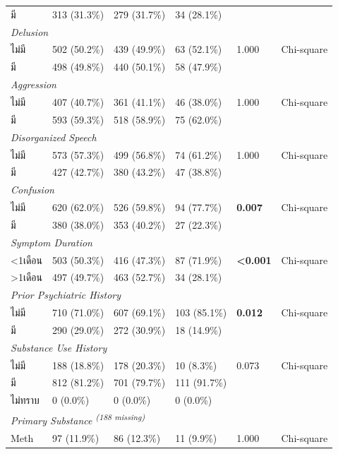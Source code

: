 \begin{table}[htbp]
\begin{tabular}{llllll}
\quad มี & 313 (31.3\%) & 279 (31.7\%) & 34 (28.1\%) &  &  \\
\multicolumn{6}{l}{\textit{Delusion}} \\
\quad ไม่มี & 502 (50.2\%) & 439 (49.9\%) & 63 (52.1\%) & 1.000 & Chi-square \\
\quad มี & 498 (49.8\%) & 440 (50.1\%) & 58 (47.9\%) &  &  \\
\multicolumn{6}{l}{\textit{Aggression}} \\
\quad ไม่มี & 407 (40.7\%) & 361 (41.1\%) & 46 (38.0\%) & 1.000 & Chi-square \\
\quad มี & 593 (59.3\%) & 518 (58.9\%) & 75 (62.0\%) &  &  \\
\multicolumn{6}{l}{\textit{Disorganized Speech}} \\
\quad ไม่มี & 573 (57.3\%) & 499 (56.8\%) & 74 (61.2\%) & 1.000 & Chi-square \\
\quad มี & 427 (42.7\%) & 380 (43.2\%) & 47 (38.8\%) &  &  \\
\multicolumn{6}{l}{\textit{Confusion}} \\
\quad ไม่มี & 620 (62.0\%) & 526 (59.8\%) & 94 (77.7\%) & \textbf{0.007} & Chi-square \\
\quad มี & 380 (38.0\%) & 353 (40.2\%) & 27 (22.3\%) &  &  \\
\multicolumn{6}{l}{\textit{Symptom Duration}} \\
\quad \textless{}1เดือน & 503 (50.3\%) & 416 (47.3\%) & 87 (71.9\%) & \textbf{<0.001} & Chi-square \\
\quad \textgreater{}1เดือน & 497 (49.7\%) & 463 (52.7\%) & 34 (28.1\%) &  &  \\
\multicolumn{6}{l}{\textit{Prior Psychiatric History}} \\
\quad ไม่มี & 710 (71.0\%) & 607 (69.1\%) & 103 (85.1\%) & \textbf{0.012} & Chi-square \\
\quad มี & 290 (29.0\%) & 272 (30.9\%) & 18 (14.9\%) &  &  \\
\multicolumn{6}{l}{\textit{Substance Use History}} \\
\quad ไม่มี & 188 (18.8\%) & 178 (20.3\%) & 10 (8.3\%) & 0.073 & Chi-square \\
\quad มี & 812 (81.2\%) & 701 (79.7\%) & 111 (91.7\%) &  &  \\
\quad ไม่ทราบ & 0 (0.0\%) & 0 (0.0\%) & 0 (0.0\%) &  &  \\
\multicolumn{6}{l}{\textit{Primary Substance \textsuperscript{(188 missing)}}} \\
\quad Meth & 97 (11.9\%) & 86 (12.3\%) & 11 (9.9\%) & 1.000 & Chi-square \\

\end{tabular}
\end{table}
